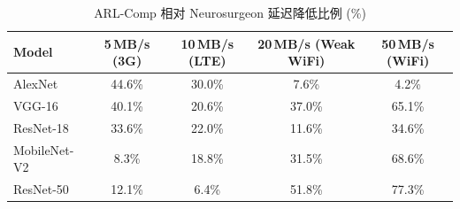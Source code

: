 \begin{table}[htbp]
\centering
\caption{ARL-Comp 相对 Neurosurgeon 延迟降低比例 (\%)}
\label{tab:arl_improvement}
\begin{tabular}{lcccc}
\toprule
\textbf{Model} & \textbf{5\,MB/s (3G)} & \textbf{10\,MB/s (LTE)} & \textbf{20\,MB/s (Weak WiFi)} & \textbf{50\,MB/s (WiFi)} \\
\midrule
AlexNet & 44.6\% & 30.0\% & 7.6\% & 4.2\% \\
VGG-16 & 40.1\% & 20.6\% & 37.0\% & 65.1\% \\
ResNet-18 & 33.6\% & 22.0\% & 11.6\% & 34.6\% \\
MobileNet-V2 & 8.3\% & 18.8\% & 31.5\% & 68.6\% \\
ResNet-50 & 12.1\% & 6.4\% & 51.8\% & 77.3\% \\
\bottomrule
\end{tabular}
\end{table}